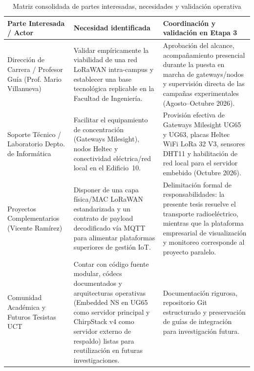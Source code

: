 \documentclass[12pt,oneside,openany,spanish,oldfontcommands]{memoir}
\renewcommand{\arraystretch}{1.15}
\begin{document}
\begin{table}[!htbp]
\centering
\caption{Matriz consolidada de partes interesadas, necesidades y validación operativa}
\label{tab:stakeholders}\label{tab:validacion-stakeholders}
\footnotesize
\setlength{\tabcolsep}{3pt}
\renewcommand{\arraystretch}{0.96}
\begin{tabularx}{\textwidth}{>{\raggedright\arraybackslash}p{3.2cm} >{\raggedright\arraybackslash}X >{\raggedright\arraybackslash}X}
\toprule
\textbf{Parte Interesada / Actor} & \textbf{Necesidad identificada} & \textbf{Coordinación y validación en Etapa 3}\\
\midrule
Dirección de Carrera / Profesor Guía (Prof. Mario Villanueva)
&
Validar empíricamente la viabilidad de una red LoRaWAN intra-campus y establecer una base tecnológica replicable en la Facultad de Ingeniería.
&
Aprobación del alcance, acompañamiento presencial durante la puesta en marcha de gateways/nodos y supervisión directa de las campañas experimentales (Agosto--Octubre 2026).
\\
\midrule
Soporte Técnico / Laboratorio Depto. de Informática
&
Facilitar el equipamiento de concentración (Gateways Milesight), nodos Heltec y conectividad eléctrica/red local en el Edificio~10.
&
Provisión efectiva de Gateways Milesight UG65 y UG63, placas Heltec WiFi LoRa 32 V3, sensores DHT11 y habilitación de red local para el servidor embebido (Octubre 2026).
\\
\midrule
Proyectos Complementarios (Vicente Ramírez)
&
Disponer de una capa física/MAC LoRaWAN estandarizada y un contrato de payload decodificado vía MQTT para alimentar plataformas superiores de gestión IoT.
&
Delimitación formal de responsabilidades: la presente tesis resuelve el transporte radioeléctrico, mientras que la plataforma empresarial de visualización y monitoreo corresponde al proyecto paralelo.
\\
\midrule
Comunidad Académica y Futuros Tesistas UCT
&
Contar con código fuente modular, códecs documentados y arquitecturas operativas (Embedded NS en UG65 como servidor principal y ChirpStack v4 como servidor externo de respaldo) listas para reutilización en futuras investigaciones.
&
Documentación rigurosa, repositorio Git estructurado y preservación de guías de integración para investigación futura.
\\
\bottomrule
\end{tabularx}
\end{table}

\end{document}
